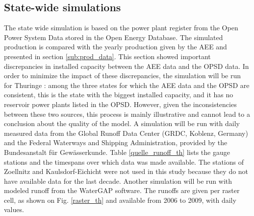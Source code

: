 \subsection{State-wide simulations} 
\label{sub:metho_sw}
The state wide simulation is based on the power plant register from the Open Power System Data stored in the Open Energy Database. The simulated production is compared with the yearly production given by the AEE and presented in section \ref{sub:prod_data}. This section showed important discrepancies in installed capacity between the AEE data and the OPSD data. In order to minimize the impact of these discrepancies, the simulation will be run for Thuringe : among the three states for which the AEE data and the OPSD are consistent, this is the state with the biggest installed capacity, and it has no reservoir power plants listed in the OPSD. However, given the inconsistencies between these two sources, this process is mainly illustrative and cannot lead to a conclusion about the quality of the model. \newline
A simulation will be run with daily measured data from the Global Runoff Data Center (GRDC, Koblenz, Germany) and the Federal Waterways and Shipping Administration, provided by the Bundesanstalt für Gewässerkunde. Table \ref{quelle_runoff_th} lists the gauge stations and the timespans over which data was made available. The stations of Zoellnitz and Kaulsdorf-Eichicht were not used in this study because they do not have available data for the last decade. Another simulation will be run with modeled runoff from the WaterGAP software. The runoffs are given per raster cell, as shown on Fig. \ref{raster_th} and available from 2006 to 2009, with daily values.

